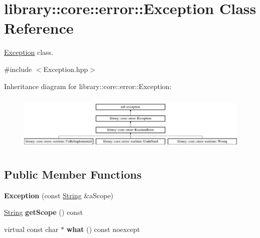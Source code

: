 \hypertarget{classlibrary_1_1core_1_1error_1_1_exception}{}\section{library\+:\+:core\+:\+:error\+:\+:Exception Class Reference}
\label{classlibrary_1_1core_1_1error_1_1_exception}


\hyperlink{classlibrary_1_1core_1_1error_1_1_exception}{Exception} class.  




{\ttfamily \#include $<$Exception.\+hpp$>$}

Inheritance diagram for library\+:\+:core\+:\+:error\+:\+:Exception\+:\begin{figure}[H]
\begin{center}
\leavevmode
\includegraphics[height=2.715152cm]{classlibrary_1_1core_1_1error_1_1_exception}
\end{center}
\end{figure}
\subsection*{Public Member Functions}
\begin{DoxyCompactItemize}
\item 
\mbox{\label{classlibrary_1_1core_1_1error_1_1_exception_a8e0c32779ff9a01d992d810848c841b7}} 
{\bfseries Exception} (const \hyperlink{classlibrary_1_1core_1_1types_1_1_string}{String} \&a\+Scope)
\item 
\mbox{\label{classlibrary_1_1core_1_1error_1_1_exception_a9c20da352aa0785b837b43cd52d09500}} 
\hyperlink{classlibrary_1_1core_1_1types_1_1_string}{String} {\bfseries get\+Scope} () const
\item 
\mbox{\label{classlibrary_1_1core_1_1error_1_1_exception_ab318a927162519b15961ca66be07fd6b}} 
virtual const char $\ast$ {\bfseries what} () const noexcept
\end{DoxyCompactItemize}


